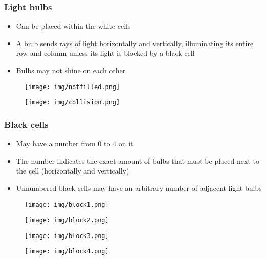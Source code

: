 \documentclass[xcolor=dvipsnames]{beamer}
\begin{document}
\begin{frame}
  \frametitle{Light bulbs}
  \begin{itemize}
  \item Can be placed within the white cells
  \item A bulb sends rays of light horizontally and vertically, illuminating its entire row and column unless its light is blocked by a black cell
  \item Bulbs may not shine on each other
  \end{itemize}
{
  \begin{figure}[b]
     \texttt{[image: img/notfilled.png]}
  \end{figure}
}

{
  \begin{figure}[b]
     \texttt{[image: img/collision.png]}
  \end{figure}
}
\end{frame}

\begin{frame}
  \frametitle{Black cells}
  \begin{itemize}
  \item May have a number from 0 to 4 on it 
  \item The number indicates the exact amount of bulbs that must be placed next to the cell (horizontally and vertically)
  \item Unnumbered black cells may have an arbitrary number of adjacent light bulbs
  \end{itemize}

{
  \begin{figure}[b]
     \texttt{[image: img/block1.png]}
  \end{figure}
}

{
  \begin{figure}[b]
     \texttt{[image: img/block2.png]}
  \end{figure}
}

{
  \begin{figure}[b]
     \texttt{[image: img/block3.png]}
  \end{figure}
}

{
  \begin{figure}[b]
     \texttt{[image: img/block4.png]}
  \end{figure}
}
\end{frame}
\end{document}
